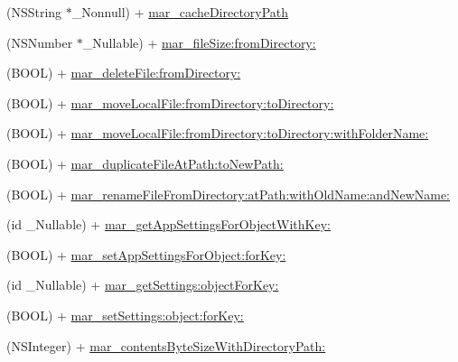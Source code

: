 \begin{DoxyCompactItemize}
\item 
(N\+S\+String $\ast$\+\_\+\+Nonnull) + \hyperlink{category_n_s_file_manager_07_m_a_r_e_x_08_a2acb85bfabe48aad57580051d964470b}{mar\+\_\+cache\+Directory\+Path}
\item 
(N\+S\+Number $\ast$\+\_\+\+Nullable) + \hyperlink{category_n_s_file_manager_07_m_a_r_e_x_08_a2b6ca963f97ef62f68eb60a5f7bdb175}{mar\+\_\+file\+Size\+:from\+Directory\+:}
\item 
(B\+O\+OL) + \hyperlink{category_n_s_file_manager_07_m_a_r_e_x_08_ab547dd4af4e305d944b72c7ed8ef73da}{mar\+\_\+delete\+File\+:from\+Directory\+:}
\item 
(B\+O\+OL) + \hyperlink{category_n_s_file_manager_07_m_a_r_e_x_08_af00a05aea9bfaf3e97d84a3c30beb1bd}{mar\+\_\+move\+Local\+File\+:from\+Directory\+:to\+Directory\+:}
\item 
(B\+O\+OL) + \hyperlink{category_n_s_file_manager_07_m_a_r_e_x_08_a38e43ad9efe39a7edd96c8bd3dcce0d0}{mar\+\_\+move\+Local\+File\+:from\+Directory\+:to\+Directory\+:with\+Folder\+Name\+:}
\item 
(B\+O\+OL) + \hyperlink{category_n_s_file_manager_07_m_a_r_e_x_08_a277c71b49acb2fee7a277907bdae8b38}{mar\+\_\+duplicate\+File\+At\+Path\+:to\+New\+Path\+:}
\item 
(B\+O\+OL) + \hyperlink{category_n_s_file_manager_07_m_a_r_e_x_08_a1b0741c9779a481247320ca490837a06}{mar\+\_\+rename\+File\+From\+Directory\+:at\+Path\+:with\+Old\+Name\+:and\+New\+Name\+:}
\item 
(id \+\_\+\+Nullable) + \hyperlink{category_n_s_file_manager_07_m_a_r_e_x_08_a4464b7dbe0f271a8a941f7c39487109e}{mar\+\_\+get\+App\+Settings\+For\+Object\+With\+Key\+:}
\item 
(B\+O\+OL) + \hyperlink{category_n_s_file_manager_07_m_a_r_e_x_08_a3f1aeb8e4554b64c34c4deb3b804f2f4}{mar\+\_\+set\+App\+Settings\+For\+Object\+:for\+Key\+:}
\item 
(id \+\_\+\+Nullable) + \hyperlink{category_n_s_file_manager_07_m_a_r_e_x_08_afd1c2711d46813edd85bc8a6ca453460}{mar\+\_\+get\+Settings\+:object\+For\+Key\+:}
\item 
(B\+O\+OL) + \hyperlink{category_n_s_file_manager_07_m_a_r_e_x_08_a1cab4f868f67e0b4dbffed9d39dffebd}{mar\+\_\+set\+Settings\+:object\+:for\+Key\+:}
\item 
(N\+S\+Integer) + \hyperlink{category_n_s_file_manager_07_m_a_r_e_x_08_adab49e693f95b5bd0685e885166b7785}{mar\+\_\+contents\+Byte\+Size\+With\+Directory\+Path\+:}
\end{DoxyCompactItemize}


